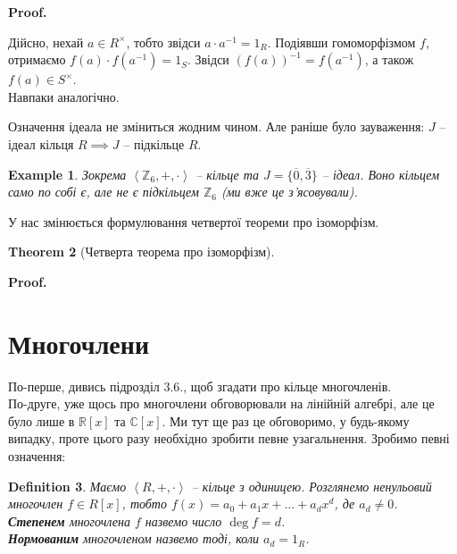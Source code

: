 \documentclass[a4paper, 10pt]{article}
\makeatletter
\theoremstyle{theoremdd}
\newtheorem{theorem}{Theorem}[subsection]
\theoremstyle{theoremdd}
\newtheorem{definition}[theorem]{Definition}
\theoremstyle{theoremdd}
\theoremstyle{theoremdd}
\theoremstyle{theoremdd}
\newtheorem{example}[theorem]{Example}
\theoremstyle{theoremdd}
\theoremstyle{theoremdd}
\theoremstyle{theoremdd}
\theoremstyle{theoremdd}
\theoremstyle{theoremdd}
\theoremstyle{theoremdd}
\theoremstyle{theoremdd}
\theoremstyle{theoremdd}
\theoremstyle{theoremdd}
\theoremstyle{theoremdd}
\renewenvironment{proof}[1][Proof.\\]{\par
\pushQED{\hfill \qed}%
\normalfont \topsep6\p@\@plus6\p@\relax
\trivlist
\item\relax
{\bfseries
#1\@addpunct{.}}\hspace\labelsep\ignorespaces
}{%
\popQED\endtrivlist\@endpefalse
}
\makeatother
\begin{document}
\begin{proof}
Дійсно, нехай $a \in R^\times$, тобто звідси $a \cdot a^{-1} = 1_R$. Подіявши гомоморфізмом $f$, отримаємо $f(a) \cdot f(a^{-1}) = 1_S$. Звідси $(f(a))^{-1} = f(a^{-1})$, а також $f(a) \in S^\times$.\\
Навпаки аналогічно.
\end{proof}

Означення ідеала не зміниться жодним чином. Але раніше було зауваження: $J$ -- ідеал кільця $R \implies J$ -- підкільце $R$. \color{red}{Зараз це вже -- неправда.}
\color{black}{}

\begin{example}
Зокрема $\left< \mathbb{Z}_6, +, \cdot \right>$ -- кільце та $J = \{\overline{0},\overline{3}\}$ -- ідеал. Воно кільцем само по собі є, але не є підкільцем $\mathbb{Z}_6$ (ми вже це з'ясовували).
\end{example}

У нас змінюється формулювання четвертої теореми про ізоморфізм.
\begin{theorem}[Четверта теорема про ізоморфізм]
\end{theorem}

\begin{proof}

\end{proof}

\newpage
\section{Многочлени}
По-перше, дивись підрозділ 3.6., щоб згадати про кільце многочленів.\\
По-друге, уже щось про многочлени обговорювали на лінійній алгебрі, але це було лише в $\mathbb{R}[x]$ та $\mathbb{C}[x]$. Ми тут ще раз це обговоримо, у будь-якому випадку, проте цього разу необхідно зробити певне узагальнення. Зробимо певні означення:

\begin{definition}
Маємо $\left< R,+,\cdot\right>$ -- кільце з одиницею. Розглянемо ненульовий многочлен $f \in R[x]$, тобто $f(x) = a_0 + a_1 x + \dots + a_d x^d$, де $a_d \neq 0$.\\
\textbf{Степенем} многочлена $f$ назвемо число $\deg f = d$.\\
\textbf{Нормованим} многочленом назвемо тоді, коли $a_d = 1_R$.
\end{definition}
\end{document}
